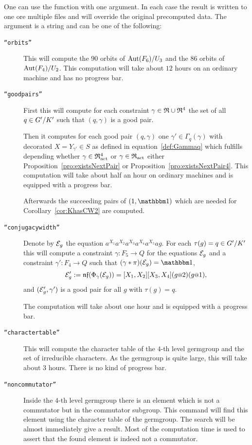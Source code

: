 \documentclass[a4paper,11pt]{amsart}
\begin{document}
One can use the function  with one argument. In each case
the result is written to one ore multiple files and will override the original precomputed data. 
The argument is a string and can be one of the following:
\begin{description}
    \item [\texttt{``orbits''}] This will compute the $90$ orbits 
    of ${\operatorname{{Aut}}(F_6)/U_3}$ and the
		$86$ orbits of ${\operatorname{{Aut}}(F_4)/U_2}$. This computation will take
		about $12$ hours on an ordinary machine and has no progress bar.
   \item [\texttt{``goodpairs''}] First this will compute for each constraint $\gamma\in\mathfrak{R}\cup\mathfrak{R}^4$ 
		      the set of all $q\in{G'/K'}$ such that $(q,\gamma)$ is a good pair.
		      
		      Then it computes for each good pair $(q,\gamma)$ one $\gamma'\in\Gamma_q(\gamma)$
		      with decorated $X=Y_{\gamma'}\in S$ as defined in equation~\ref{def:Gammaq} which 
		      fulfills depending whether $\gamma\in\mathfrak{R}^4_{\operatorname{act}}$ or $\gamma\in\mathfrak{R}_{\operatorname{act}}$ 
		      either Proposition~\ref{pro:existsNextPair} or Proposition~\ref{pro:existsNextPair4}.
		      This computation will take about half an hour on ordinary machines
           and is equipped with a progress bar. 
		      
		      Afterwards the succeeding pairs of $(1,\id)$ which are 
          needed for Corollary~\ref{cor:KhasCW2} are computed. 
   \item [\texttt{``conjugacywidth''}] Denote by $\mathcal{E}_g$ the equation $a^{X_1}a^{X_2}a^{X_3}a^{X_4}a^{X_5}ag$.
		      For each $\tau(g)=q\in{G'/K'}$ this will compute a constraint 
		      $\gamma\colon F_5 \to Q$ for the equations $\mathcal{E}_g$
		      and a constraint $\gamma'\colon F_4\to Q$ such that
		      $(\gamma * \pi)(\eq{E}_g) = \id$,
		      \[\eq{E}'_g := \nf(\Phi_\gamma(\eq{E}_g))=[X_1,X_2][X_3,X_4](g\at{2})(g\at{1}),\] and
		      $(\mathcal{E}'_g,\gamma')$ is a good pair for all $g$ with $\tau(g)=q$.
		      
		      The computation will take about one hour and is equipped with a progress bar.
   \item [\texttt{``charactertable''}] This will compute the character table of the $4$-th level germgroup
		      and the set of irreducible characters. 
		      As the germgroup is quite large, this
		      will take about $3$ hours. There is no kind of progress bar.
   \item [\texttt{``noncommutator''}] Inside the $4$-th level germgroup there is an element which is not
		      a commutator but in the commutator subgroup. This command will find this 
		      element using the character table of the germgroup. The search will be 
		      almost immediately give a result. Most of the computation time is used
		      to assert that the found element is indeed not a commutator.
		      

\end{description}
\end{document}
